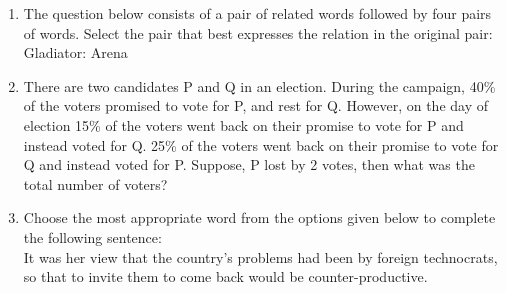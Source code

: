 \documentclass[a4paper, 11pt]{article}
\begin{document}
\begin{enumerate}
    \hfill{}

    \item The question below consists of a pair of related words followed by four pairs of words. Select the pair that best expresses the relation in the original pair: Gladiator: Arena
    
    \begin{enumerate}
    \end{enumerate}

    \hfill{}

    \item There are two candidates P and Q in an election. During the campaign, 40\% of the voters promised to vote for P, and rest for Q. However, on the day of election 15\% of the voters went back on their promise to vote for P and instead voted for Q. 25\% of the voters went back on their promise to vote for Q and instead voted for P. Suppose, P lost by 2 votes, then what was the total number of voters?
    
    \begin{enumerate}
    \end{enumerate}
    
    \hfill{}

    \item Choose the most appropriate word from the options given below to complete the following sentence:\\It was her view that the country's problems had been \underline{\hspace{2cm}} by foreign technocrats, so that to invite them to come back would be counter-productive.
    
    \begin{enumerate}
    \end{enumerate}


\end{enumerate}
\end{document}
